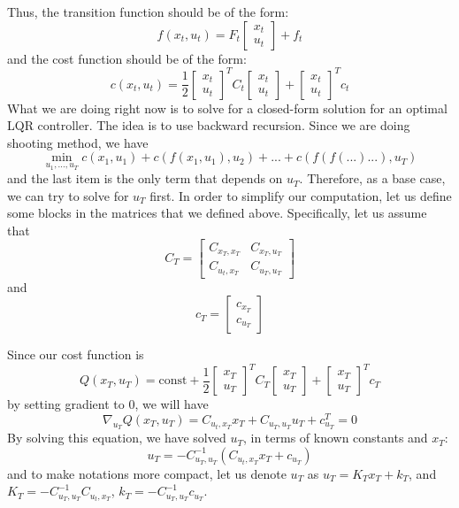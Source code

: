 Thus, the transition function should be of the form:
\[
f(x_t,u_t) = F_t \begin{bmatrix} x_t\\u_t\end{bmatrix}+f_t
\]
and the cost function should be of the form:
\[
c(x_t,u_t) = \frac{1}{2}\begin{bmatrix}x_t\\u_t\end{bmatrix}^TC_t\begin{bmatrix}x_t\\u_t\end{bmatrix}+\begin{bmatrix}x_t\\u_t\end{bmatrix}^Tc_t
\]
What we are doing right now is to solve for a closed-form solution for an optimal LQR controller. The idea is to use backward recursion. Since we are doing shooting method, we have $$\min_{u_1,...,u_T}c(x_1,u_1) + c(f(x_1,u_1),u_2)+...+c(f(f(...)...),u_T)$$
and the last item is the only term that depends on $u_T$. Therefore, as a base case, we can try to solve for $u_T$ first. In order to simplify our computation, let us define some blocks in the matrices that we defined above. Specifically, let us assume that
\[
C_T = \begin{bmatrix} C_{x_T,x_T}& C_{x_T,u_T}\\C_{u_t,x_T}&C_{u_T,u_T}\end{bmatrix}
\]
and
\[
c_T=\begin{bmatrix}c_{x_T}\\c_{u_T}\end{bmatrix}
\]

Since our cost function is
\[
Q(x_T,u_T) = \mathrm{const} + \frac{1}{2}\begin{bmatrix}x_T\\u_T\end{bmatrix}^TC_T\begin{bmatrix}x_T\\u_T\end{bmatrix}+\begin{bmatrix}x_T\\u_T\end{bmatrix}^Tc_T
\]
by setting gradient to 0, we will have 
\[
\nabla_{u_T}Q(x_T,u_T) = C_{u_t,x_T}x_T+C_{u_T,u_T}u_T+c_{u_T}^T=0
\]
By solving this equation, we have solved $u_T$, in terms of known constants and $x_T$:
\[
u_T = -C_{u_T,u_T}^{-1}(C_{u_t,x_T}x_T+c_{u_T})
\]
and to make notations more compact, let us denote $u_T$ as $u_T = K_Tx_T+k_T$, and $K_T = -C_{u_T,u_T}^{-1}C_{u_t,x_T}$, $k_T = -C_{u_T,u_T}^{-1}c_{u_T}$.

